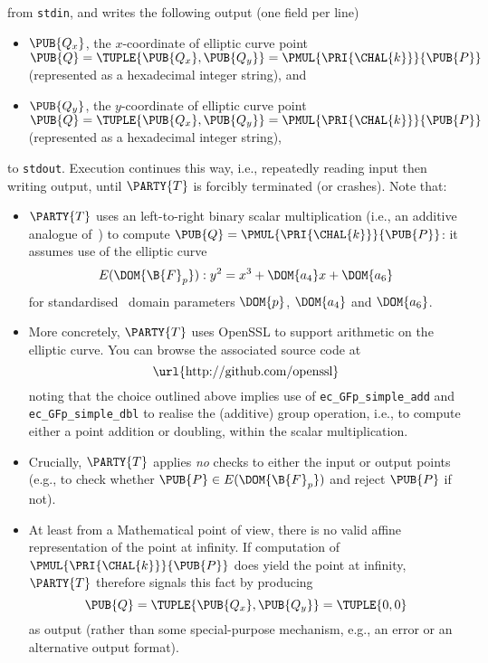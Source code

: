 \noindent
from \lstinline[language={bash}]{stdin},
and 
writes the following output (one field per line)

\begin{itemize}
\item $\PUB{Q_x}$,
      the $x$-coordinate of elliptic curve point $\PUB{Q} = \TUPLE{ \PUB{Q_x}, \PUB{Q_y} } = \PMUL{\PRI{\CHAL{k}}}{\PUB{P}}$
      (represented as a                   hexadecimal integer string),
      and
\item $\PUB{Q_y}$,
      the $y$-coordinate of elliptic curve point $\PUB{Q} = \TUPLE{ \PUB{Q_x}, \PUB{Q_y} } = \PMUL{\PRI{\CHAL{k}}}{\PUB{P}}$
      (represented as a                   hexadecimal integer string),
\end{itemize}

\noindent
to   \lstinline[language={bash}]{stdout}.
Execution continues this way, i.e., repeatedly reading input then writing 
output, until $\PARTY{T}$ is forcibly terminated (or crashes).
Note that:

\begin{itemize}
\item $\PARTY{T}$ uses an left-to-right binary scalar multiplication
      (i.e., an additive analogue of~\cite[Section 2.1]{SCALE:Gordon:85}) to 
      compute $\PUB{Q} = \PMUL{\PRI{\CHAL{k}}}{\PUB{P}}$: it assumes use of 
      the
       elliptic curve
      \[
      E( \DOM{\B{F}_p} ) : y^2 = x^3 + \DOM{a_4} x + \DOM{a_6}
      \]
      for standardised~\cite{SCALE:FIPS:186:00} domain parameters $\DOM{p}$, 
      $\DOM{a_4}$ and $\DOM{a_6}$.
\item More concretely, $\PARTY{T}$ uses OpenSSL to support arithmetic on the
      elliptic curve.  You can browse the associated source code at
      \[
      \mbox{\url{http://github.com/openssl}}
      \]
      noting that the choice outlined above implies use of 
      \lstinline[language={C}]{ec_GFp_simple_add}
      and
      \lstinline[language={C}]{ec_GFp_simple_dbl}
      to realise the (additive) group operation, i.e., to compute either a
      point addition or doubling, within the scalar multiplication.
\item Crucially, $\PARTY{T}$ applies {\em no} checks to either the input or
      output points (e.g., to check whether 
      $
      \PUB{P} \in E( \DOM{\B{F}_p} )
      $ 
      and reject $\PUB{P}$ if not).
\item At least from a Mathematical point of view, there is no valid affine 
      representation of the point at infinity.  If computation of
      $
      \PMUL{\PRI{\CHAL{k}}}{\PUB{P}}
      $
      does yield the point at infinity, $\PARTY{T}$ therefore signals this 
      fact by producing
      \[
      \PUB{Q} = \TUPLE{ \PUB{Q_x}, \PUB{Q_y} } = \TUPLE{ 0, 0 }
      \]
      as output 
      (rather than some special-purpose mechanism, e.g., an error or an alternative output format).
\end{itemize}

